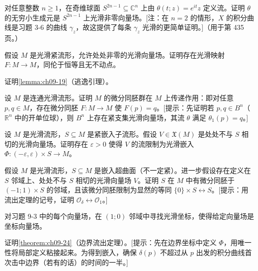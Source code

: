\documentclass[../../main.tex]{subfiles}
\begin{document}
\begin{exercise}\label{exercise:ch09-04}
对任意整数 $n\geqslant 1$，在奇维球面 $S^{2n-1}\subseteq\mathbb{C}^n$ 上由 $\theta(t;z)=e^{it}z$ 定义流。证明 $\theta$ 的无穷小生成元是 $S^{2n-1}$ 上光滑非零向量场。[注：在 $n=2$ 的情形，$X$ 的积分曲线是习题 3-6 的曲线 $\gamma_z$，故这提供了每条 $\gamma_z$ 光滑的更简单证明。]（用于第 435 页。）
\end{exercise}

\begin{exercise}\label{exercise:ch09-05}
假设 $M$ 是光滑紧流形，允许处处非零的光滑向量场。证明存在光滑映射 $F\colon M\to M$，同伦于恒等且无不动点。
\end{exercise}

\begin{exercise}\label{exercise:ch09-06}
证明\cref{lemma:ch09-19}（逃逸引理）。
\end{exercise}

\begin{exercise}\label{exercise:ch09-07}
设 $M$ 是连通光滑流形。证明 $M$ 的微分同胚群在 $M$ 上传递作用：即对任意 $p,q\in M$，存在微分同胚 $F\colon M\to M$ 使 $F(p)=q$。[提示：先证明若 $p,q\in B^n$（$\mathbb{R}^n$ 中的开单位球），则 $B^n$ 上存在紧支集光滑向量场，其流 $\theta$ 满足 $\theta_1(p)=q$。]
\end{exercise}

\begin{exercise}\label{exercise:ch09-08}
设 $M$ 是光滑流形，$S\subseteq M$ 是紧嵌入子流形。假设 $V\in\mathfrak{X}(M)$ 是处处不与 $S$ 相切的光滑向量场。证明存在 $\varepsilon>0$ 使得 $V$ 的流限制为光滑嵌入 $\Phi\colon(-\varepsilon,\varepsilon)\times S\to M$。
\end{exercise}

\begin{exercise}\label{exercise:ch09-09}
假设 $M$ 是光滑流形，$S\subseteq M$ 是嵌入超曲面（不一定紧）。进一步假设存在定义在 $S$ 邻域上、处处不与 $S$ 相切的光滑向量场 $V$。证明 $S$ 在 $M$ 中有微分同胚于 $(-1;1)\times S$ 的邻域，且该微分同胚限制为显然的等同 $\{0\}\times S\leftrightarrow S$。[提示：用流出定理的记号，证明 $\mathcal{O}_\delta\leftrightarrow\mathcal{O}_1$。]
\end{exercise}

\begin{exercise}\label{exercise:ch09-10}
对习题 9-3 中的每个向量场，在 $(1;0)$ 邻域中寻找光滑坐标，使得给定向量场是坐标向量场。
\end{exercise}

\begin{exercise}\label{exercise:ch09-11}
证明\cref{theorem:ch09-24}（边界流出定理）。[提示：先在边界坐标中定义 $\Phi$，用唯一性将局部定义粘接起来。为得到嵌入，确保 $\delta(p)$ 不超过从 $p$ 出发的积分曲线首次击中边界（若有的话）的时间的一半。]
\end{exercise}
\end{document}
